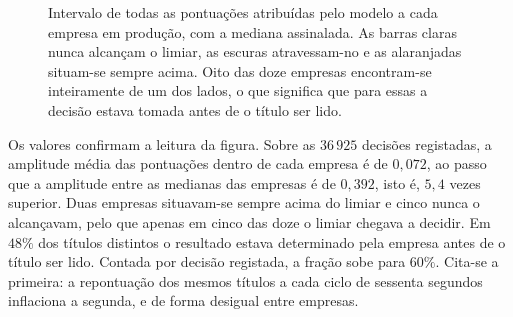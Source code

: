 \begin{figure}[ht]
\centering
{}
\caption[O que a porta de decisão separava]{Intervalo de todas as pontuações atribuídas pelo modelo a
cada empresa em produção, com a mediana assinalada. As barras claras nunca alcançam o limiar, as
escuras atravessam-no e as alaranjadas situam-se sempre acima. Oito das doze empresas encontram-se
inteiramente de um dos lados, o que significa que para essas a decisão estava tomada antes de o
título ser lido.}
\label{fig:av_porta}
\end{figure}

Os valores confirmam a leitura da figura. Sobre as $36\,925$ decisões registadas, a amplitude média
das pontuações dentro de cada empresa é de $0{,}072$, ao passo que a amplitude entre as medianas das
empresas é de $0{,}392$, isto é, $5{,}4$ vezes superior. Duas empresas situavam-se sempre acima do
limiar e cinco nunca o alcançavam, pelo que apenas em cinco das doze o limiar chegava a decidir. Em $48\%$ dos títulos distintos o resultado estava determinado pela empresa antes de o título ser
lido. Contada por decisão registada, a fração sobe para $60\%$. Cita-se a primeira: a repontuação
dos mesmos títulos a cada ciclo de sessenta segundos inflaciona a segunda, e de forma desigual
entre empresas.

